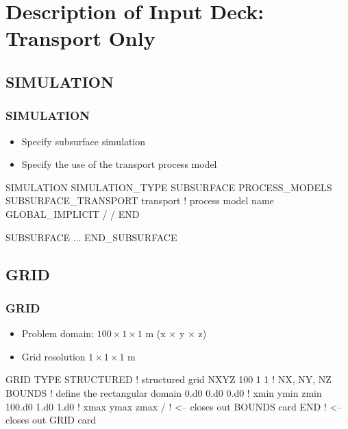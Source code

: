 \documentclass{beamer}
\newcommand\bluecomment[1]{{{\color{blue} #1}}}
\begin{document}
\section{Description of Input Deck: Transport Only}


\subsection{SIMULATION}

\begin{frame}[fragile]\frametitle{SIMULATION}

\begin{itemize}
  \item Specify subsurface simulation
  \item Specify the use of the transport process model
\end{itemize}


\begin{semiverbatim}

SIMULATION
  SIMULATION_TYPE SUBSURFACE
  PROCESS_MODELS
    SUBSURFACE_TRANSPORT transport \bluecomment{! process model name}
      GLOBAL_IMPLICIT
    /
  /
END

SUBSURFACE
  ...
END_SUBSURFACE
\end{semiverbatim}

\end{frame}

\subsection{GRID}
\begin{frame}\frametitle{GRID}

\begin{itemize}
  \item Problem domain: $100 \times 1 \times 1$ m (x $\times$ y $\times$ z)
  \item Grid resolution $1 \times 1 \times 1$ m
\end{itemize}

\begin{semiverbatim}
GRID
  TYPE STRUCTURED     \bluecomment{! structured grid}
  NXYZ 100 1 1        \bluecomment{! NX, NY, NZ}
  BOUNDS              \bluecomment{! define the rectangular domain}
    0.d0 0.d0 0.d0    \bluecomment{! xmin ymin zmin}
    100.d0 1.d0 1.d0  \bluecomment{! xmax ymax zmax}
  /  \bluecomment{! <-- closes out BOUNDS card}
END  \bluecomment{! <-- closes out GRID card}
\end{semiverbatim}

\end{frame}
\end{document}
